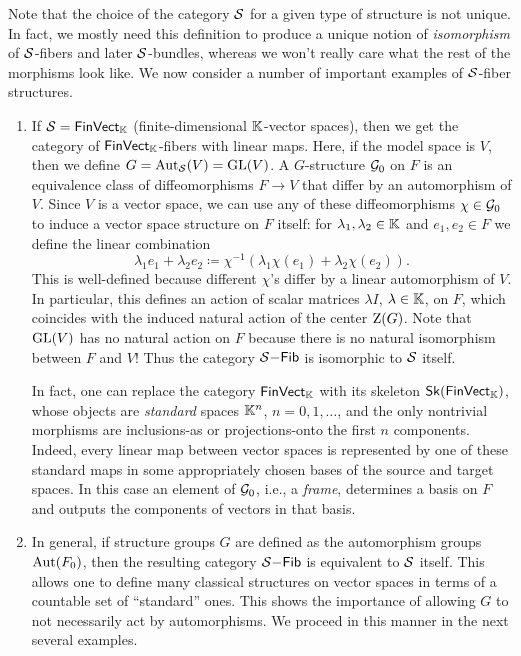 Note that the choice of the category $\mathcal{S}$ for a given type of structure is not unique. In fact, we mostly need this definition to produce a unique notion of \emph{isomorphism} of $\mathcal{S}$-fibers and later $\mathcal{S}$-bundles, whereas we won't really care what the rest of the morphisms look like. We now consider a number of important examples of $\mathcal{S}$-fiber structures.
\begin{example}\label{ex linear G-structures}
    \begin{enumerate}
        \item If $\mathcal{S}=\mathsf{FinVect}_{\mathbb{K}}$ (finite-dimensional $\mathbb{K}$-vector spaces), then we get the category of $\mathsf{FinVect}_{\mathbb{K}}$-fibers with linear maps. Here, if the model space is $V$, then we define $G=\operatorname{Aut}_{\mathcal{S}}(V)=\operatorname{GL}(V)$. A $G$-structure $\mathcal{G}_0$ on $F$ is an equivalence class of diffeomorphisms $F\to V$ that differ by an automorphism of $V$. Since $V$ is a vector space, we can use any of these diffeomorphisms $\chi\in\mathcal{G}_0$ to induce a vector space structure on $F$ itself: for $\lambda_1,\lambda_2\in\mathbb{K}$ and $e_1,e_2\in F$ we define the linear combination
        \[\lambda_1e_1+\lambda_2 e_2\coloneqq \chi^{-1}(\lambda_1\chi(e_1)+\lambda_2\chi(e_2)).\]
        This is well-defined because different $\chi$'s differ by a linear automorphism of $V$. In particular, this defines an action of scalar matrices $\lambda I$, $\lambda\in\mathbb{K}$, on $F$, which coincides with the induced natural action of the center $\mathrm{Z}(G)$. Note that $\operatorname{GL}(V)$ has no natural action on $F$ because there is no natural isomorphism between $F$ and $V$! Thus the category $\mathcal{S}\mathsf{-Fib}$ is isomorphic to $\mathcal{S}$ itself.

        In fact, one can replace the category $\mathsf{FinVect}_{\mathbb{K}}$ with its skeleton $\mathsf{Sk}(\mathsf{FinVect}_{\mathbb{K}})$, whose objects are \emph{standard} spaces $\mathbb{K}^n$, $n=0,1,\ldots$, and the only nontrivial morphisms are inclusions-as or projections-onto the first $n$ components. Indeed, every linear map between vector spaces is represented by one of these standard maps in some appropriately chosen bases of the source and target spaces. In this case an element of $\mathcal{G}_0$, i.e., a \emph{frame}, determines a basis on $F$ and outputs the components of vectors in that basis.
        
        \item In general, if structure groups $G$ are defined as the automorphism groups $\operatorname{Aut}(F_0)$, then the resulting category $\mathcal{S}\mathsf{-Fib}$ is equivalent to $\mathcal{S}$ itself. This allows one to define many classical structures on vector spaces in terms of a countable set of ``standard'' ones. This shows the importance of allowing $G$ to not necessarily act by automorphisms. We proceed in this manner in the next several examples.
        

\end{enumerate}
\end{example}
